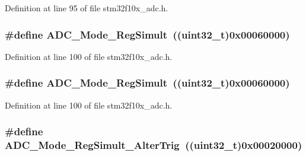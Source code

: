Definition at line 95 of file stm32f10x\+\_\+adc.\+h.

\subsubsection[{\texorpdfstring{A\+D\+C\+\_\+\+Mode\+\_\+\+Reg\+Simult}{ADC_Mode_RegSimult}}]{\setlength{\rightskip}{0pt plus 5cm}\#define A\+D\+C\+\_\+\+Mode\+\_\+\+Reg\+Simult~(({\bf uint32\+\_\+t})0x00060000)}\hypertarget{group___a_d_c__mode_ga71298f7453c2b4392a9c622328b3c93d}{}\label{group___a_d_c__mode_ga71298f7453c2b4392a9c622328b3c93d}


Definition at line 100 of file stm32f10x\+\_\+adc.\+h.

\subsubsection[{\texorpdfstring{A\+D\+C\+\_\+\+Mode\+\_\+\+Reg\+Simult}{ADC_Mode_RegSimult}}]{\setlength{\rightskip}{0pt plus 5cm}\#define A\+D\+C\+\_\+\+Mode\+\_\+\+Reg\+Simult~(({\bf uint32\+\_\+t})0x00060000)}\hypertarget{group___a_d_c__mode_ga71298f7453c2b4392a9c622328b3c93d}{}\label{group___a_d_c__mode_ga71298f7453c2b4392a9c622328b3c93d}


Definition at line 100 of file stm32f10x\+\_\+adc.\+h.

\subsubsection[{\texorpdfstring{A\+D\+C\+\_\+\+Mode\+\_\+\+Reg\+Simult\+\_\+\+Alter\+Trig}{ADC_Mode_RegSimult_AlterTrig}}]{\setlength{\rightskip}{0pt plus 5cm}\#define A\+D\+C\+\_\+\+Mode\+\_\+\+Reg\+Simult\+\_\+\+Alter\+Trig~(({\bf uint32\+\_\+t})0x00020000)}\hypertarget{group___a_d_c__mode_gae3d5fbf93f60d75534364bf9db78f632}{}\label{group___a_d_c__mode_gae3d5fbf93f60d75534364bf9db78f632}


